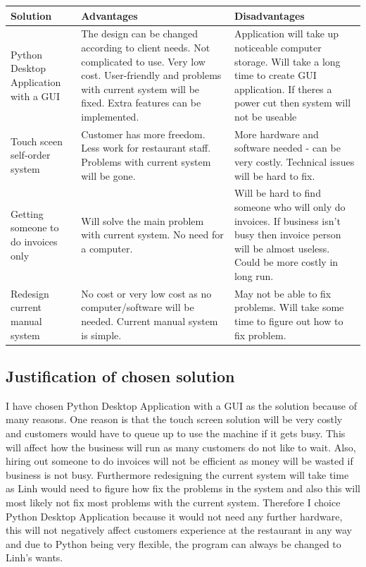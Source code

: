 \begin{center}

\begin{tabular}{ | p{2cm} | p{4cm} | p{5cm} |   }
    \hline
    \textbf{Solution} & \textbf{Advantages} & \textbf{Disadvantages} \\ \hline
   Python Desktop Application with a GUI & The design can be changed according to client needs. Not complicated to use. Very low cost. User-friendly and problems with current system will be fixed. Extra features can be implemented. &Application will take up noticeable computer storage. Will take a long 	time to create GUI application. If theres a power cut then system will not be useable \\ \hline
	Touch sceen self-order system & Customer has more freedom.  Less work for restaurant staff. Problems with current system will be gone. & More hardware and software needed - can be very 			costly. Technical issues will be hard to fix. \\ \hline
	Getting someone to do invoices only & Will solve the main problem with current system. No need for a computer. & Will be hard to find someone who will only do invoices. If business isn't busy then invoice person will be almost useless. Could be more costly in long run. \\ \hline
	Redesign current manual system & No cost or very low cost as no computer/software will be needed. Current manual system is simple.& May not be able to fix problems. Will take some time to figure out how to fix problem. \\ \hline


\end{tabular}
\label{tab:Solution_table}
\end{center}


\subsection{Justification of chosen solution}

I have chosen Python Desktop  Application with a GUI  as the solution because of many reasons. One reason is that the touch screen solution will be very costly and customers would have to queue up to use the machine if it gets busy. This will affect how the business will run as many customers do not like to wait. Also, hiring out someone to do invoices will not be efficient as money will be wasted if business is not busy. Furthermore redesigning the current system will take time as Linh would need to figure how fix the problems in the system and also this will most likely not fix most problems with the current system. Therefore I choice Python Desktop Application because it would not need any further hardware, this will not negatively affect customers experience at the restaurant in any way and due to Python being very flexible, the program can always be changed to Linh's wants.
	
